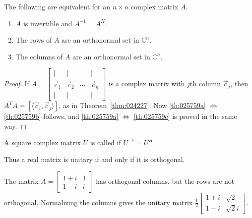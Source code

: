 \documentclass{ximera}
\begin{document}
\begin{theorem}\label{th:025759}
The following are equivalent for an $n \times n$ complex matrix $A$.

\begin{enumerate}
\item\label{th:025759a} $A$ is invertible and $A^{-1} = A^{H}$.

\item\label{th:025759b} The rows of $A$ are an orthonormal set in $\mathbb{C}^n$.

\item\label{th:025759c} The columns of $A$ are an orthonormal set in $\mathbb{C}^n$.

\end{enumerate}
\end{theorem}

\begin{proof}
If $A = \left[ \begin{array}{cccc}
| & | & & | \\
\vec{c}_{1} & \vec{c}_{2} & \cdots & \vec{c}_{n} \\
| & | & & |
\end{array}\right]$ is a complex matrix with $j$th column $\vec{c}_{j}$, then $A^T\overline{A} = \left[ \langle \vec{c}_{i}, \vec{c}_{j}\rangle \right]$, as in Theorem~\ref{thm:024227}. Now \ref{th:025759a} $\Leftrightarrow$ \ref{th:025759b} follows, and \ref{th:025759a} $\Leftrightarrow$ \ref{th:025759c} is proved in the same way.
\end{proof}

\begin{definition}\label{def:Unitary}
A square complex matrix $U$ is called  if $U^{-1} = U^{H}$.
\end{definition}

Thus a real matrix is unitary if and only if it is orthogonal.


\begin{example}\label{ex:025787}
The matrix $A = \left[ \begin{array}{rr}
1 + i & 1 \\
1 - i & i
\end{array}\right]$ has orthogonal columns, but the rows are not orthogonal. Normalizing the columns gives the unitary matrix $\frac{1}{2}\left[ \begin{array}{rr}
	1 + i & \sqrt{2} \\
	1 - i & \sqrt{2}i
\end{array}\right]$.
\end{example}
\end{document}
